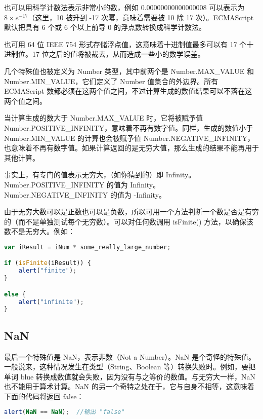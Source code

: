 也可以用科学计数法表示非常小的数，例如 0.00000000000000008 可以表示为$\text{8}\times e^{-\text{17}}$（这里，10 被升到 -17 次幂，意味着需要被 10 除 17 次）。ECMAScript 默认把具有 6 个或 6 个以上前导 0 的浮点数转换成科学计数法。

也可用 64 位 IEEE 754 形式存储浮点值，这意味着十进制值最多可以有 17 个十进制位。17 位之后的值将被裁去，从而造成一些小的数学误差。


几个特殊值也被定义为 Number 类型，其中前两个是 Number.MAX\_VALUE 和 Number.MIN\_VALUE，它们定义了 Number 值集合的外边界。所有 ECMAScript 数都必须在这两个值之间，不过计算生成的数值结果可以不落在这两个值之间。

当计算生成的数大于 Number.MAX\_VALUE 时，它将被赋予值 Number.POSITIVE\_INFINITY，意味着不再有数字值。同样，生成的数值小于 Number.MIN\_VALUE 的计算也会被赋予值 Number.NEGATIVE\_INFINITY，也意味着不再有数字值。如果计算返回的是无穷大值，那么生成的结果不能再用于其他计算。

事实上，有专门的值表示无穷大，（如你猜到的）即 Infinity。Number.POSITIVE\_INFINITY 的值为 Infinity。Number.NEGATIVE\_INFINITY 的值为 -Infinity。

由于无穷大数可以是正数也可以是负数，所以可用一个方法判断一个数是否是有穷的（而不是单独测试每个无穷数）。可以对任何数调用 isFinite() 方法，以确保该数不是无穷大。例如：



\begin{lstlisting}[language=JavaScript]
var iResult = iNum * some_really_large_number;

if (isFinite(iResult)) {
    alert("finite");
}

else {
    alert("infinite");
}
\end{lstlisting}


\subsection{NaN}


最后一个特殊值是 NaN，表示非数（Not a Number）。NaN 是个奇怪的特殊值。一般说来，这种情况发生在类型（String、Boolean 等）转换失败时。例如，要把单词 blue 转换成数值就会失败，因为没有与之等价的数值。与无穷大一样，NaN 也不能用于算术计算。NaN 的另一个奇特之处在于，它与自身不相等，这意味着下面的代码将返回 false：


\begin{lstlisting}[language=JavaScript]
alert(NaN == NaN);  //输出 "false"
\end{lstlisting}

